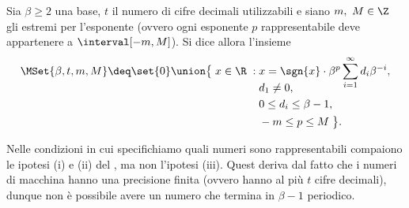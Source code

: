\begin{definition}
    Sia $\beta \geq 2$ una base, $t$ il numero di cifre decimali utilizzabili e siano $m,\ M \in \Z$ gli estremi per l'esponente (ovvero ogni esponente $p$ rappresentabile deve appartenere a $\interval[{-m, M}]$). Si dice allora  l'insieme\[
        \MSet{\beta, t, m, M} \deq \set{0} \union
        \begin{aligned}[t]
            \big\{\; x \in \R \;:\; &x = \sgn{x}\cdot\beta^p\sum_{i=1}^\infty d_i\beta^{-i},\\[-1em]
            &d_1 \neq 0,\\
            &0 \leq d_i \leq \beta-1,\\ 
            &-m \leq p \leq M \;\big\}.
        \end{aligned}
    \] 
\end{definition}

\begin{remark}
    Nelle condizioni in cui specifichiamo quali numeri sono rappresentabili compaiono le ipotesi (i) e (ii) del , ma non l'ipotesi (iii). Quest deriva dal fatto che i numeri di macchina hanno una precisione finita (ovvero hanno al più $t$ cifre decimali), dunque non è possibile avere un numero che termina in $\beta-1$ periodico.
\end{remark}

